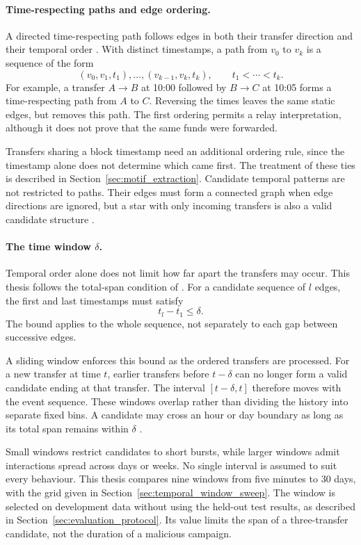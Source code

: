 \paragraph{Time-respecting paths and edge ordering.}
A directed time-respecting path follows edges in both their transfer direction
and their temporal order \citep{kovanen2011temporal}. With distinct timestamps,
a path from $v_0$ to $v_k$ is a sequence of the form
\[
    (v_0,v_1,t_1),\ldots,(v_{k-1},v_k,t_k),
    \qquad t_1 < \cdots < t_k.
\]
For example, a transfer
$A \to B$ at 10:00 followed by $B \to C$ at 10:05 forms a time-respecting path
from $A$ to $C$. Reversing the times leaves the same static edges, but removes
this path. The first ordering permits a relay interpretation, although it does
not prove that the same funds were forwarded.

Transfers sharing a block timestamp need an additional ordering rule, since the
timestamp alone does not determine which came first. The treatment of these ties
is described in Section~\ref{sec:motif_extraction}. Candidate temporal patterns
are not restricted to paths. Their edges must form a connected graph when edge
directions are ignored, but a star with only incoming transfers is also a valid
candidate structure \citep{paranjape2017motifs}.

\paragraph{The time window $\delta$.}
Temporal order alone does not limit how far apart the transfers may occur.
This thesis follows the total-span condition of \citet{paranjape2017motifs}.
For a candidate sequence of $l$ edges, the first and last timestamps must satisfy
\[
    t_l - t_1 \leq \delta.
\]
The bound applies to the whole sequence, not separately to each gap between
successive edges.

A sliding window enforces this bound as the ordered transfers are processed.
For a new transfer at time $t$, earlier transfers before $t-\delta$ can no
longer form a valid candidate ending at that transfer. The interval
$[t-\delta,t]$ therefore moves with the event sequence. These windows overlap
rather than dividing the history into separate fixed bins. A candidate may
cross an hour or day boundary as long as its total span remains within
$\delta$ \citep{paranjape2017motifs}.

Small windows restrict candidates to short bursts, while larger windows admit
interactions spread across days or weeks. No single interval is assumed to
suit every behaviour. This thesis compares nine windows from five minutes to
30 days, with the grid given in Section~\ref{sec:temporal_window_sweep}.
The window is selected on development data without using the held-out test
results, as described in Section~\ref{sec:evaluation_protocol}. Its value limits
the span of a three-transfer candidate, not the duration of a malicious campaign.
